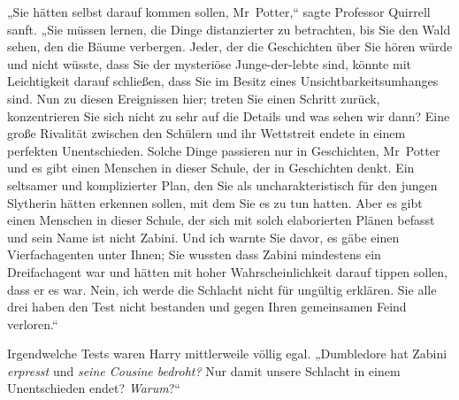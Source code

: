 „Sie hätten selbst darauf kommen sollen, Mr~Potter,“ sagte Professor Quirrell sanft. „Sie müssen lernen, die Dinge distanzierter zu betrachten, bis Sie den Wald sehen, den die Bäume verbergen. Jeder, der die Geschichten über Sie hören würde und nicht wüsste, dass Sie der mysteriöse Junge-der-lebte sind, könnte mit Leichtigkeit darauf schließen, dass Sie im Besitz eines Unsichtbarkeitsumhanges sind. Nun zu diesen Ereignissen hier; treten Sie einen Schritt zurück, konzentrieren Sie sich nicht zu sehr auf die Details und was sehen wir dann? Eine große Rivalität zwischen den Schülern und ihr Wettstreit endete in einem perfekten Unentschieden. Solche Dinge passieren nur in Geschichten, Mr~Potter und es gibt einen Menschen in dieser Schule, der in Geschichten denkt. Ein seltsamer und komplizierter Plan, den Sie als uncharakteristisch für den jungen Slytherin hätten erkennen sollen, mit dem Sie es zu tun hatten. Aber es gibt einen Menschen in dieser Schule, der sich mit solch elaborierten Plänen befasst und sein Name ist nicht Zabini. Und ich warnte Sie davor, es gäbe einen Vierfachagenten unter Ihnen; Sie wussten dass Zabini mindestens ein Dreifachagent war und hätten mit hoher Wahrscheinlichkeit darauf tippen sollen, dass er es war. Nein, ich werde die Schlacht nicht für ungültig erklären. Sie alle drei haben den Test nicht bestanden und gegen Ihren gemeinsamen Feind verloren.“

Irgendwelche Tests waren Harry mittlerweile völlig egal. „Dumbledore hat Zabini \emph{erpresst} und \emph{seine Cousine bedroht?} Nur damit unsere Schlacht in einem Unentschieden endet? \emph{Warum}?“

